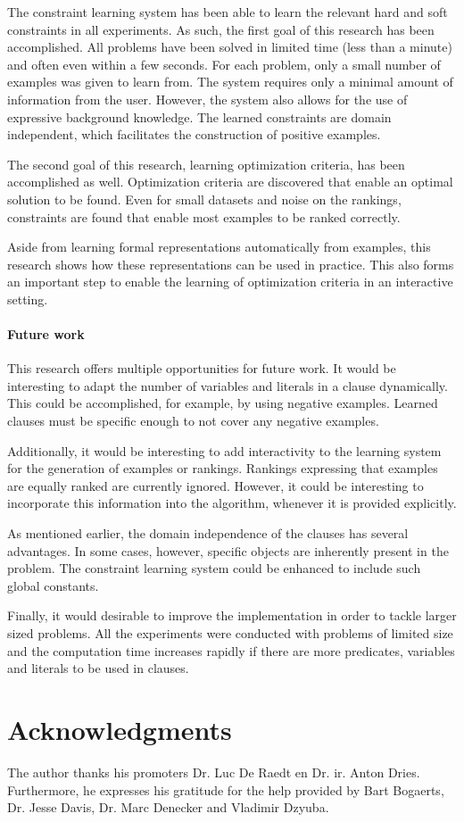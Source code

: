 \documentclass[letterpaper]{article}
\theoremstyle{definition}
\begin{document}
The constraint learning system has been able to learn the relevant hard and soft constraints in all experiments.
As such, the first goal of this research has been accomplished.
All problems have been solved in limited time (less than a minute) and often even within a few seconds.
For each problem, only a small number of examples was given to learn from.
The system requires only a minimal amount of information from the user.
However, the system also allows for the use of expressive background knowledge.
The learned constraints are domain independent, which facilitates the construction of positive examples.

The second goal of this research, learning optimization criteria, has been accomplished as well.
Optimization criteria are discovered that enable an optimal solution to be found.
Even for small datasets and noise on the rankings, constraints are found that enable most examples to be ranked correctly.

Aside from learning formal representations automatically from examples, this research shows how these representations can be used in practice.
This also forms an important step to enable the learning of optimization criteria in an interactive setting.

\paragraph{Future work}
This research offers multiple opportunities for future work.
It would be interesting to adapt the number of variables and literals in a clause dynamically.
This could be accomplished, for example, by using negative examples.
Learned clauses must be specific enough to not cover any negative examples. 

Additionally, it would be interesting to add interactivity to the learning system for the generation of examples or rankings.
Rankings expressing that examples are equally ranked are currently ignored.
However, it could be interesting to incorporate this information into the algorithm, whenever it is provided explicitly.

As mentioned earlier, the domain independence of the clauses has several advantages.
In some cases, however, specific objects are inherently present in the problem.
The constraint learning system could be enhanced to include such global constants.

Finally, it would desirable to improve the implementation in order to tackle larger sized problems.
All the experiments were conducted with problems of limited size and the computation time increases rapidly if there are more predicates, variables and literals to be used in clauses.

\section*{Acknowledgments}
The author thanks his promoters Dr. Luc De Raedt en Dr. ir. Anton Dries.
Furthermore, he expresses his gratitude for the help provided by Bart Bogaerts, Dr. Jesse Davis, Dr. Marc Denecker and Vladimir Dzyuba.

\newpage

%
%


\end{document}
